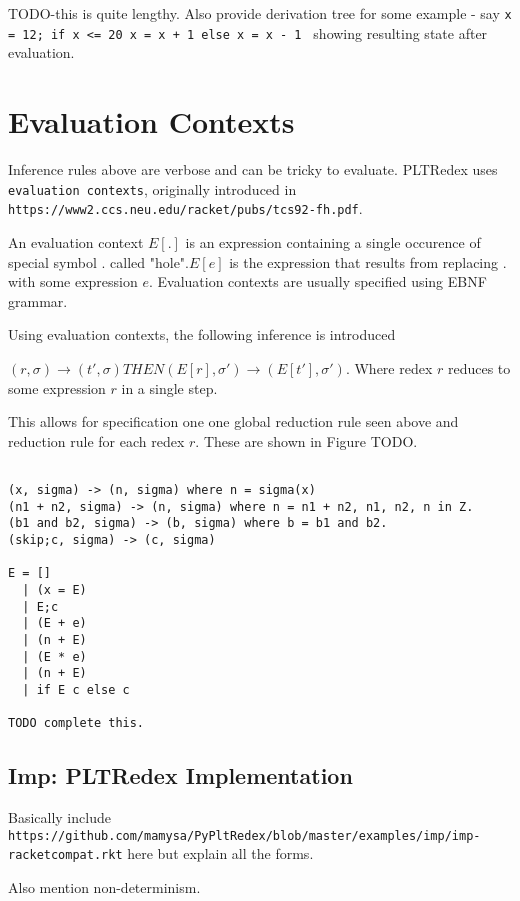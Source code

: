 TODO-this is quite lengthy. Also provide derivation tree for some example - say \texttt{x = 12; if x <= 20 x = x + 1 else x = x - 1 } showing resulting state after evaluation.


\section{Evaluation Contexts}

Inference rules above are verbose and can be tricky to evaluate. PLTRedex uses \texttt{evaluation contexts}, originally introduced in \texttt{https://www2.ccs.neu.edu/racket/pubs/tcs92-fh.pdf}. 

An evaluation context $E[.]$ is an expression containing a single occurence of special symbol $.$ called "hole".$E[e]$ is the expression that results from replacing $.$ with some expression $e$. Evaluation contexts are usually specified using EBNF grammar. 

Using evaluation contexts, the following inference is introduced

$(r, \sigma) \rightarrow (t\prime, \sigma) THEN (E[r], \sigma\prime) \rightarrow (E[t\prime], \sigma\prime)$. Where redex $r$ reduces to some expression $r$ in a single step.

This allows for specification one one global reduction rule seen above and reduction rule for each redex $r$. These are shown in Figure TODO.

\begin{lstlisting}

(x, sigma) -> (n, sigma) where n = sigma(x)
(n1 + n2, sigma) -> (n, sigma) where n = n1 + n2, n1, n2, n in Z.
(b1 and b2, sigma) -> (b, sigma) where b = b1 and b2.
(skip;c, sigma) -> (c, sigma)

E = []
  | (x = E)
  | E;c
  | (E + e)
  | (n + E)
  | (E * e)
  | (n + E)
  | if E c else c
 
TODO complete this.
\end{lstlisting}


\subsection{Imp: PLTRedex Implementation}

Basically include \texttt{https://github.com/mamysa/PyPltRedex/blob/master/examples/imp/imp-racketcompat.rkt} here but explain all the forms.

Also mention non-determinism.

